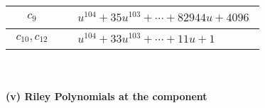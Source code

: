 \documentclass[1p]{elsarticle_modified}
\theoremstyle{definition}
\begin{document}
\begin{tabular}{m{50pt}|m{274pt}}
\hline $$\begin{aligned}c_{9}\end{aligned}$$&$\begin{aligned}
&u^{104}+35 u^{103}+\cdots+82944 u+4096
\end{aligned}$\\
\hline $$\begin{aligned}c_{10},c_{12}\end{aligned}$$&$\begin{aligned}
&u^{104}+33 u^{103}+\cdots+11 u+1
\end{aligned}$\\
\hline
\end{tabular}\\~\\
\newpage\renewcommand{\arraystretch}{1}
\flushleft \textbf{(v) Riley Polynomials at the component}\newline \\
\end{document}
